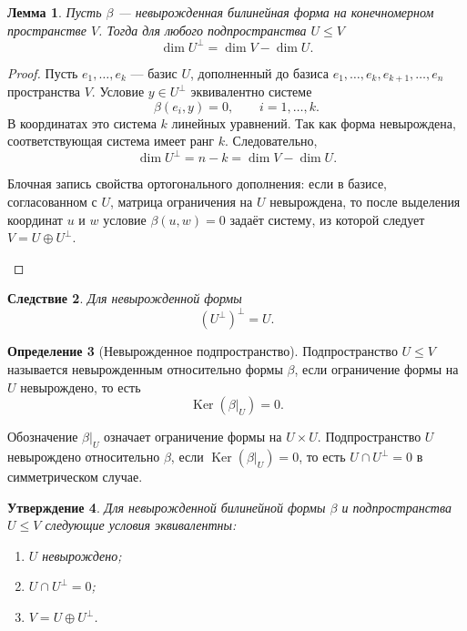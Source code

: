 \documentclass[12pt,a4paper]{article}
\theoremstyle{definition}
\newtheorem{definition}{Определение}[section]
\theoremstyle{plain}
\newtheorem{lemma}[definition]{Лемма}
\newtheorem{proposition}[definition]{Утверждение}
\newtheorem{corollary}[definition]{Следствие}
\theoremstyle{remark}
\newenvironment{knowledgefix}{\begin{clarifybox}}{\end{clarifybox}}
\newcommand{\Ker}{\operatorname{Ker}}
\begin{document}
\begin{lemma}
Пусть $\beta$ --- невырожденная билинейная форма на конечномерном пространстве $V$.
Тогда для любого подпространства $U\le V$
\[
    \dim U^\perp=\dim V-\dim U.
\]
\end{lemma}

\begin{proof}
Пусть $e_1,\ldots,e_k$ --- базис $U$, дополненный до базиса
$e_1,\ldots,e_k,e_{k+1},\ldots,e_n$ пространства $V$.
Условие $y\in U^\perp$ эквивалентно системе
\[
    \beta(e_i,y)=0,
    \qquad i=1,\ldots,k.
\]
В координатах это система $k$ линейных уравнений.
Так как форма невырождена, соответствующая система имеет ранг $k$.
Следовательно,
\[
    \dim U^\perp=n-k=\dim V-\dim U.
\]
\begin{knowledgefix}
Блочная запись свойства ортогонального дополнения: если в базисе, согласованном с \(U\), матрица ограничения на \(U\) невырождена, то после выделения координат \(u\) и \(w\) условие \(\beta(u,w)=0\) задаёт систему, из которой следует \(V=U\oplus U^\perp\).
\end{knowledgefix}
\end{proof}

\begin{corollary}
Для невырожденной формы
\[
    (U^\perp)^\perp=U.
\]
\end{corollary}

\begin{definition}[Невырожденное подпространство]
Подпространство $U\le V$ называется невырожденным относительно формы $\beta$, если ограничение формы на $U$ невырождено, то есть
\[
    \Ker(\beta|_U)=0.
\]
\begin{knowledgefix}
Обозначение \(\beta|_U\) означает ограничение формы на \(U\times U\). Подпространство \(U\) невырождено относительно \(\beta\), если \(\Ker(\beta|_U)=0\), то есть \(U\cap U^\perp=0\) в симметрическом случае.
\end{knowledgefix}
\end{definition}

\begin{proposition}
Для невырожденной билинейной формы $\beta$ и подпространства $U\le V$ следующие условия эквивалентны:
\begin{enumerate}[label=\arabic*)]
    \item $U$ невырождено;
    \item $U\cap U^\perp=0$;
    \item $V=U\oplus U^\perp$.
\end{enumerate}
\end{proposition}
\end{document}
